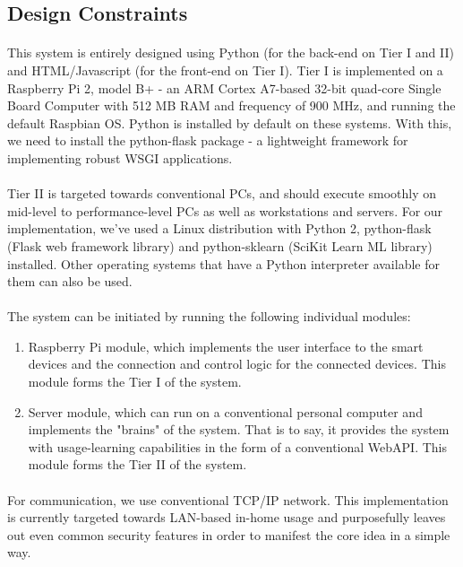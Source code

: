 \pagebreak
\subsection{Design Constraints}
\paragraph{}
This system is entirely designed using Python (for the back-end on Tier I and II) and HTML/Javascript (for the front-end on Tier I). Tier I is implemented on a Raspberry Pi 2, model B+ - an ARM Cortex A7-based 32-bit quad-core Single Board Computer with 512 MB RAM and frequency of 900 MHz, and running the default Raspbian OS. Python is installed by default on these systems. With this, we need to install the python-flask package - a lightweight framework for implementing robust WSGI applications.
\paragraph{}
Tier II is targeted  towards conventional PCs, and should execute smoothly on mid-level to performance-level PCs as well as workstations and servers. For our implementation, we've used a Linux distribution with Python 2, python-flask (Flask web framework library) and python-sklearn (SciKit Learn ML library) installed. Other operating systems that have a Python interpreter available for them can also be used.
\paragraph{}
The system can be initiated by running the following individual modules:
\begin{enumerate}
\item Raspberry Pi module, which implements the user interface to the smart devices and the connection and control logic for the connected devices. This module forms the Tier I of the system.
\item Server module, which can run on a conventional personal computer and implements the "brains" of the system. That is to say, it provides the system with usage-learning capabilities in the form of a conventional WebAPI. This module forms the Tier II of the system.
\end{enumerate}
\paragraph{}
For communication, we use conventional TCP/IP network. This implementation is currently targeted towards LAN-based in-home usage and purposefully leaves out even common security features in order to manifest the core idea in a simple way.